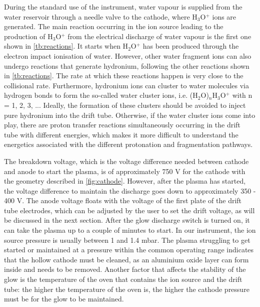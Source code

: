 During the standard use of the instrument, water vapour is supplied from the water reservoir through a needle valve to the cathode, where H$_3$O$^+$ ions are generated.
The main reaction occurring in the ion source leading to the production of H$_3$O$^+$ from the electrical discharge of water vapour is the first one shown in \autoref{tb:reactions}. It starts when H$_2$O$^+$ has been produced through the electron impact ionisation of water. However, other water fragment ions can also undergo reactions that generate hydronium, following the other reactions shown in \autoref{tb:reactions}. The rate  at which these reactions happen is very close to the collisional  rate.
Furthermore, hydronium ions can cluster to water molecules via hydrogen bonds to form the so-called water cluster ions, i.e. (H$_2$O)$_n$H$_3$O$^+$ with n = 1, 2, 3, ...
Ideally, the formation of these clusters should be avoided to inject pure hydronium into the drift tube.
Otherwise, if the water cluster ions come into play, there are  proton transfer reactions simultaneously occurring in the drift tube with different energies, which makes it more difficult to understand the energetics associated with the different protonation and fragmentation pathways.


The breakdown voltage, which is the voltage difference needed between cathode and anode to start the plasma, is of approximately 750 V for the cathode with the geometry described in \autoref{fig:cathode}.
%
However, after the plasma has started, the voltage difference to maintain the discharge goes down to approximately 350 - 400 V.
%
The anode voltage floats with the voltage of the first plate of the drift tube electrodes, which can be adjusted by the user to set the drift voltage, as will be discussed in the next section. After the glow discharge switch is turned on, it can take the plasma up to a couple of minutes to start.
In our instrument, the ion source pressure is usually between 1 and 1.4 mbar.
The plasma struggling to get started or maintained at a pressure  within the common operating range
indicates that the hollow cathode must be cleaned, as an aluminium oxide layer can form inside  and needs to be removed. Another factor that affects the stability of the glow is the temperature of the oven that contains the ion source and the drift tube: %
the higher the temperature of the oven is, the higher the cathode pressure must be for the glow to be maintained.



